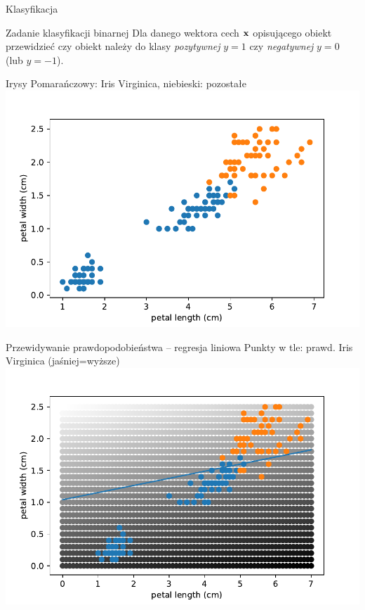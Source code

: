 \documentclass{sa}
\subtitle{Klasyfikacja}
\renewcommand{\vec}[1]{\ensuremath\mathbf{#1}}
\begin{document}
\begin{frame}
\titlepage
\end{frame}

\begin{frame}{Klasyfikacja}
\begin{block}{Zadanie klasyfikacji binarnej}
Dla danego wektora cech $\vec{x}$ opisującego obiekt przewidzieć czy obiekt należy do klasy \emph{pozytywnej} $y=1$ czy \emph{negatywnej} $y=0$ (lub $y=-1$).
\end{block}
\end{frame}

\begin{frame}{Irysy}
Pomarańczowy: Iris Virginica, niebieski: pozostałe
\includegraphics[width=\textwidth]{iris-simplified.pdf}
\end{frame}

\begin{frame}{Przewidywanie prawdopodobieństwa -- regresja liniowa}
Punkty w tle: prawd. Iris Virginica (jaśniej=wyższe)
\includegraphics[width=\textwidth]{iris-simplified-linreg.pdf}
\end{frame}
\end{document}

